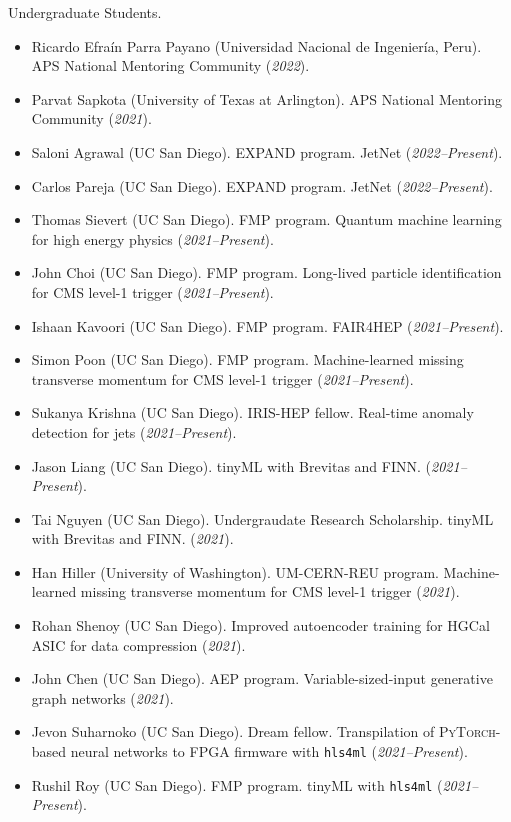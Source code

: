 \documentclass{res}
\begin{document}
\begin{resume}
  Undergraduate Students.
  \begin{itemize}
    \itemsep-0.3em
    \item Ricardo Efra\'{i}n Parra Payano (Universidad Nacional de Ingenier\'{i}a, Peru). APS National Mentoring Community (\textit{2022}).
    \item Parvat Sapkota (University of Texas at Arlington). APS National Mentoring Community (\textit{2021}).
    \item Saloni Agrawal (UC San Diego). EXPAND program. JetNet (\textit{2022--Present}).
    \item Carlos Pareja (UC San Diego). EXPAND program. JetNet (\textit{2022--Present}).
    \item Thomas Sievert (UC San Diego). FMP program. Quantum machine learning for high energy physics (\textit{2021--Present}).
    \item John Choi (UC San Diego). FMP program. Long-lived particle identification for CMS level-1 trigger (\textit{2021--Present}).
    \item Ishaan Kavoori (UC San Diego). FMP program. FAIR4HEP (\textit{2021--Present}).
    \item Simon Poon (UC San Diego). FMP program. Machine-learned missing transverse momentum for CMS level-1 trigger (\textit{2021--Present}).
    \item Sukanya Krishna (UC San Diego). IRIS-HEP fellow. Real-time anomaly detection for jets (\textit{2021--Present}).
    \item Jason Liang (UC San Diego). tinyML with Brevitas and FINN. (\textit{2021--Present}).
    \item Tai Nguyen (UC San Diego). Undergraudate Research Scholarship. tinyML with Brevitas and FINN. (\textit{2021}).
    \item Han Hiller (University of Washington). UM-CERN-REU program. Machine-learned missing transverse momentum for CMS level-1 trigger (\textit{2021}).
    \item Rohan Shenoy (UC San Diego). Improved autoencoder training for HGCal ASIC for data compression (\textit{2021}).
    \item John Chen (UC San Diego). AEP program. Variable-sized-input generative graph networks (\textit{2021}).
    \item Jevon Suharnoko (UC San Diego). Dream fellow. Transpilation of \textsc{PyTorch}-based neural networks to FPGA firmware with \texttt{hls4ml} (\textit{2021--Present}).
    \item Rushil Roy (UC San Diego). FMP program. tinyML with \texttt{hls4ml} (\textit{2021--Present}).

\end{itemize}
\end{resume}
\end{document}
